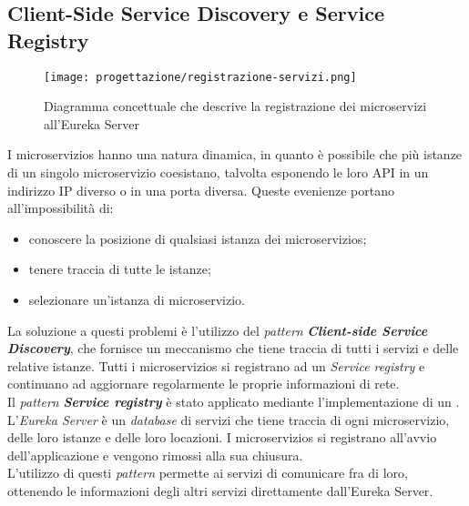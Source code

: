 \subsection{Client-Side Service Discovery e Service Registry}
\label{sub:ServiceRegistry}
\begin{figure}[H]
    \centering
    \texttt{[image: progettazione/registrazione-servizi.png]}
    \caption{Diagramma concettuale che descrive la registrazione dei
        microservizi all'\gls{Eureka Server}}
\end{figure}
I \glspl{microservizio} hanno una natura dinamica, in quanto è possibile che
più istanze di un singolo \gls{microservizio} coesistano, talvolta
esponendo le loro \gls{API} in un indirizzo \gls{IP} diverso o in una porta
diversa. Queste evenienze portano all'impossibilità di:
\begin{itemize}
    \item conoscere la posizione di qualsiasi istanza dei
          \glspl{microservizio};
    \item tenere traccia di tutte le istanze;
    \item selezionare un'istanza di \gls{microservizio}.
\end{itemize}
La soluzione a questi problemi è l'utilizzo del \textit{pattern}
\textbf{\textit{Client-side Service Discovery}}, che fornisce un meccanismo che
tiene traccia di tutti i servizi e delle relative istanze. Tutti i
\glspl{microservizio} si registrano ad un \textit{Service registry} e
continuano ad aggiornare regolarmente le proprie informazioni di
rete.\cite{site-spring-boot-microservizi}\\
Il \textit{pattern} \textbf{\textit{Service registry}} è stato applicato
mediante l'implementazione di un . L'\textit{Eureka
    Server} è un \textit{database} di servizi che tiene traccia di ogni
\gls{microservizio}, delle loro istanze e delle loro locazioni. I
\glspl{microservizio} si registrano all'avvio dell'applicazione e vengono
rimossi alla sua chiusura.\\
L'utilizzo di questi \textit{pattern}  permette ai servizi di comunicare fra di
loro, ottenendo le informazioni degli altri servizi direttamente
dall'\gls{Eureka Server}.\cite{site-service-registry}
